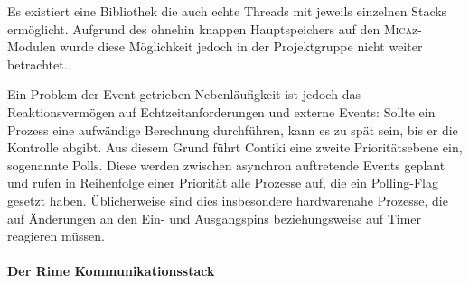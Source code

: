 Es existiert eine Bibliothek die auch echte Threads mit jeweils einzelnen Stacks ermöglicht. Aufgrund des ohnehin knappen Hauptspeichers auf den \textsc{Mica}z-Modulen wurde diese Möglichkeit jedoch in der Projektgruppe nicht weiter betrachtet.

Ein Problem der Event-getrieben Nebenläufigkeit ist jedoch das Reaktionsvermögen auf Echtzeitanforderungen und externe Events: Sollte ein Prozess eine aufwändige Berechnung durchführen, kann es zu spät sein, bis er die Kontrolle abgibt. Aus diesem Grund führt Contiki eine zweite Prioritätsebene ein, sogenannte Polls. Diese werden zwischen asynchron auftretende Events geplant und rufen in Reihenfolge einer Priorität alle Prozesse auf, die ein Polling-Flag gesetzt haben. Üblicherweise sind dies insbesondere hardwarenahe Prozesse, die auf Änderungen an den Ein- und Ausgangspins beziehungsweise auf Timer reagieren müssen.
\paragraph{Der Rime Kommunikationsstack}\mbox{}\\
\label{sec:rime}



